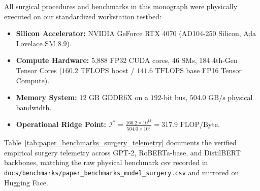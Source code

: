All surgical procedures and benchmarks in this monograph were physically executed on our standardized workstation testbed:
\begin{itemize}
    \item \textbf{Silicon Accelerator:} NVIDIA GeForce RTX 4070 (AD104-250 Silicon, Ada Lovelace SM 8.9).
    \item \textbf{Compute Hardware:} 5,888 FP32 CUDA cores, 46 SMs, 184 4th-Gen Tensor Cores ($160.2\text{ TFLOPS}$ boost / $141.6\text{ TFLOPS}$ base FP16 Tensor Compute).
    \item \textbf{Memory System:} $12\text{ GB}$ GDDR6X on a $192$-bit bus, $504.0\text{ GB/s}$ physical bandwidth.
    \item \textbf{Operational Ridge Point:} $\mathcal{I}^* = \frac{160.2\times 10^{12}}{504.0\times 10^9} = 317.9\text{ FLOP/Byte}$.
\end{itemize}

Table~\ref{tab:paper_benchmarks_surgery_telemetry} documents the verified empirical surgery telemetry across GPT-2, RoBERTa-base, and DistilBERT backbones, matching the raw physical benchmark csv recorded in \texttt{docs/benchmarks/paper\_benchmarks\_model\_surgery.csv} and mirrored on Hugging Face.

